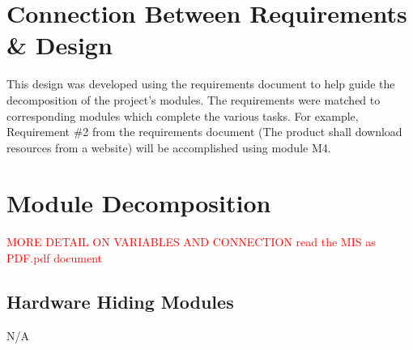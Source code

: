 \documentclass[titlepage]{article}
\begin{document}
\section{Connection Between Requirements \& Design}

This design was developed using the requirements document to help guide the decomposition of the project's modules. The requirements were matched to corresponding modules which complete the various tasks. For example, Requirement \#2 from the requirements document (The product shall download resources from a website) will be accomplished using module M4.


\section{Module Decomposition}
\textcolor{red}{MORE DETAIL ON VARIABLES AND CONNECTION read the MIS as PDF.pdf document}
\subsection{Hardware Hiding Modules}
N/A
\end{document}
